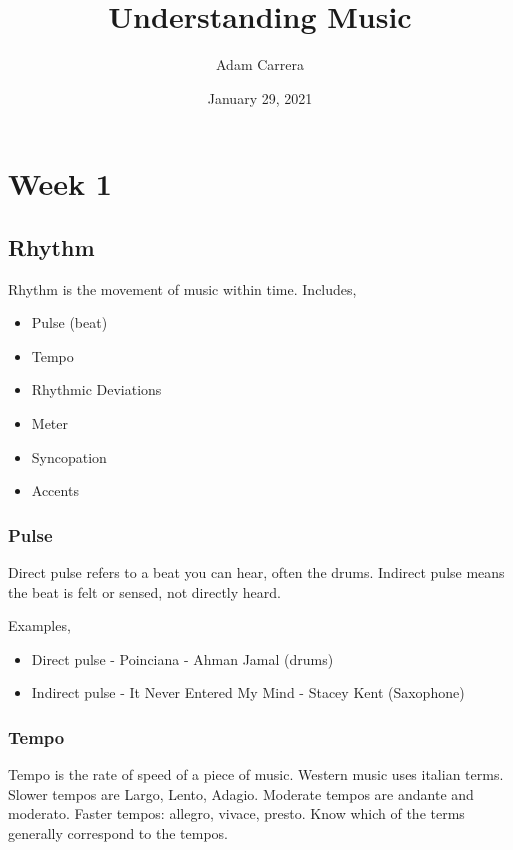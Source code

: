 \documentclass[12pt, a4paper]{report}
\title{Understanding Music}
\author{Adam Carrera}
\date{January 29, 2021}
\begin{document}
  \maketitle

  \part{Week 1}

  \chapter{Rhythm}

  Rhythm is the movement of music within time. Includes,

  \begin{itemize}
    \item Pulse (beat)
    \item Tempo
    \item Rhythmic Deviations
    \item Meter
    \item Syncopation
    \item Accents
  \end{itemize}

  \section{Pulse}

  Direct pulse refers to a beat you can hear, often the drums. Indirect pulse means the beat is felt or sensed, not directly heard.

  Examples,

  \begin{itemize}
    \item Direct pulse - Poinciana - Ahman Jamal (drums)
    \item Indirect pulse - It Never Entered My Mind - Stacey Kent (Saxophone)
  \end{itemize}

  \section{Tempo}

  Tempo is the rate of speed of a piece of music. Western music uses italian terms. Slower tempos are Largo, Lento, Adagio. Moderate tempos are andante and moderato. Faster tempos: allegro, vivace, presto. Know which of the terms generally correspond to the tempos.
\end{document}
